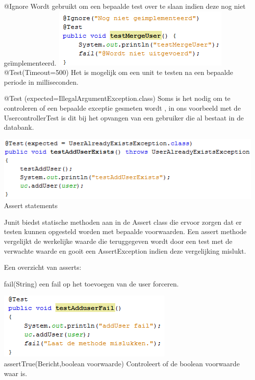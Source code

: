\documentclass[pdftex,a4paper,12pt,twoside]{report}
\begin{document}
@Ignore
Wordt gebruikt om een bepaalde test over te slaan indien deze nog niet geïmplementeerd.
\includegraphics{images/junit2.png}\\

@Test(Timeout=500)
Het is mogelijk om een unit te testen na een bepaalde periode in milliseconden.

@Test (expected=IllegalArgumentException.class)
Soms is het nodig om te controleren of een bepaalde exceptie gesmeten wordt , in ons voorbeeld met de UsercontrollerTest is dit bij het opvangen van een gebruiker die al bestaat in de databank.

\includegraphics{images/junit3.png}\\

Assert statements

Junit biedst statische methoden aan in de Assert class die ervoor zorgen dat er testen kunnen opgesteld worden met bepaalde voorwaarden.
Een assert methode vergelijkt de werkelijke waarde die teruggegeven wordt door een test met de verwachte waarde en gooit een AssertException indien deze vergelijking mislukt.

Een overzicht van asserts:

fail(String)
een fail op het toevoegen van de user forceren.

\includegraphics{images/adduserfail.png}\\

assertTrue(Bericht,boolean voorwaarde)
Controleert of de boolean voorwaarde waar is.
\end{document}
